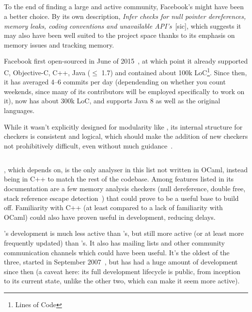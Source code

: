 \subsection{}

To the end of finding a large and active community, Facebook's  might have been a better choice. By its own description, \textit{Infer checks for null pointer dereferences, memory leaks, coding conventions and unavailable API’s}~[sic], which suggests it may also have been well suited to the project space thanks to its emphasis on memory issues and tracking memory.

Facebook first open-sourced  in June of 2015~\cite{infergit}, at which point it already supported C, Objective-C, C++, Java ($\le$ 1.7) and contained about 100k LoC\footnote{Lines of Code}. Since then, it has averaged 4–6 commits per day (dependending on whether you count weekends, since many of its contributors will be employed specifically to work on it), now has about 300k LoC, and supports Java 8 as well as the original languages.

While it wasn't explicitly designed for modularity like , its internal structure for checkers is consistent and logical, which should make the addition of new checkers not prohibitively difficult, even without much guidance~\cite{infercheckers}.

\subsection{}

, which  depends on, is the only analyser in this list not written in OCaml, instead being in C++ to match the rest of the  codebase. Among features listed in its documentation are a few memory analysis checkers (null dereference, double free, stack reference escape detection~\cite{clangchecks}) that could prove to be a useful base to build off. Familiarity with C++ (at least compared to a lack of familiarity with OCaml) could also have proven useful in development, reducing delays.

's development is much less active than 's, but still more active (or at least more frequently updated) than 's. It also has mailing lists and other community communication channels which could have been useful. It's the oldest of the three, started in September 2007~\cite{clangrelease}, but has had a huge amount of development since then (a caveat here: its full development lifecycle is public, from inception to its current state, unlike the other two, which can make it seem more active).

